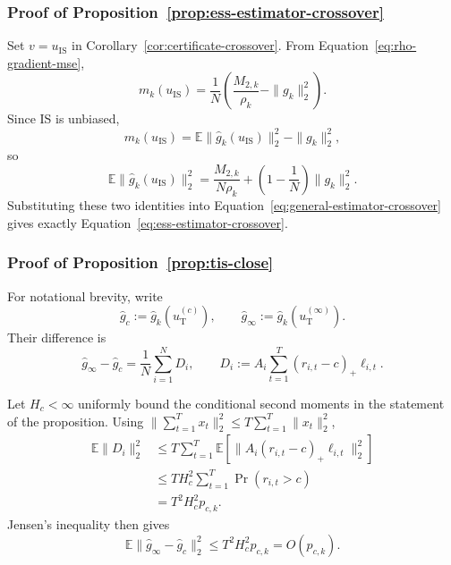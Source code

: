 \documentclass[11pt]{article}
\theoremstyle{remark}
\newcommand{\E}{\mathbb{E}}
\begin{document}
\subsubsection{Proof of Proposition~\ref{prop:ess-estimator-crossover}}

Set $v=u_{\mathrm{IS}}$ in
Corollary~\ref{cor:certificate-crossover}. From
Equation~\eqref{eq:rho-gradient-mse},
\[
 m_k(u_{\mathrm{IS}})
 =
 \frac1N
 \left(
 \frac{M_{2,k}}{\rho_k}
 -
 \|g_k\|_2^2
 \right).
\]
Since IS is unbiased,
\[
 m_k(u_{\mathrm{IS}})
 =
 \E\|\widehat g_k(u_{\mathrm{IS}})\|_2^2
 -
 \|g_k\|_2^2,
\]
so
\[
 \E\|\widehat g_k(u_{\mathrm{IS}})\|_2^2
 =
 \frac{M_{2,k}}{N\rho_k}
 +
 \left(1-\frac1N\right)\|g_k\|_2^2.
\]
Substituting these two identities into
Equation~\eqref{eq:general-estimator-crossover} gives exactly
Equation~\eqref{eq:ess-estimator-crossover}.


\subsubsection{Proof of Proposition~\ref{prop:tis-close}}

For notational brevity, write
\[
 \widehat g_c
 :=
 \widehat g_k(u_{\mathrm T}^{(c)}),
 \qquad
 \widehat g_\infty
 :=
 \widehat g_k(u_{\mathrm T}^{(\infty)}).
\]
Their difference is
\[
 \widehat g_\infty-\widehat g_c
 =
 \frac1N\sum_{i=1}^N D_i,
 \qquad
 D_i
 :=
 A_i\sum_{t=1}^T
 (r_{i,t}-c)_+\ell_{i,t}.
\]

Let $H_c<\infty$ uniformly bound the conditional second moments in the
statement of the proposition. Using
$\|\sum_{t=1}^T x_t\|_2^2\le
T\sum_{t=1}^T\|x_t\|_2^2$,
\begin{align*}
 \E\|D_i\|_2^2
 &\le
 T\sum_{t=1}^T
 \E\left[
 \|A_i(r_{i,t}-c)_+\ell_{i,t}\|_2^2
 \right]\\
 &\le
 T H_c^2
 \sum_{t=1}^T
 \Pr(r_{i,t}>c)\\
 &=
 T^2H_c^2p_{c,k}.
\end{align*}
Jensen's inequality then gives
\[
 \E\|\widehat g_\infty-\widehat g_c\|_2^2
 \le
 T^2H_c^2p_{c,k}
 =
 O(p_{c,k}).
\]
\end{document}
